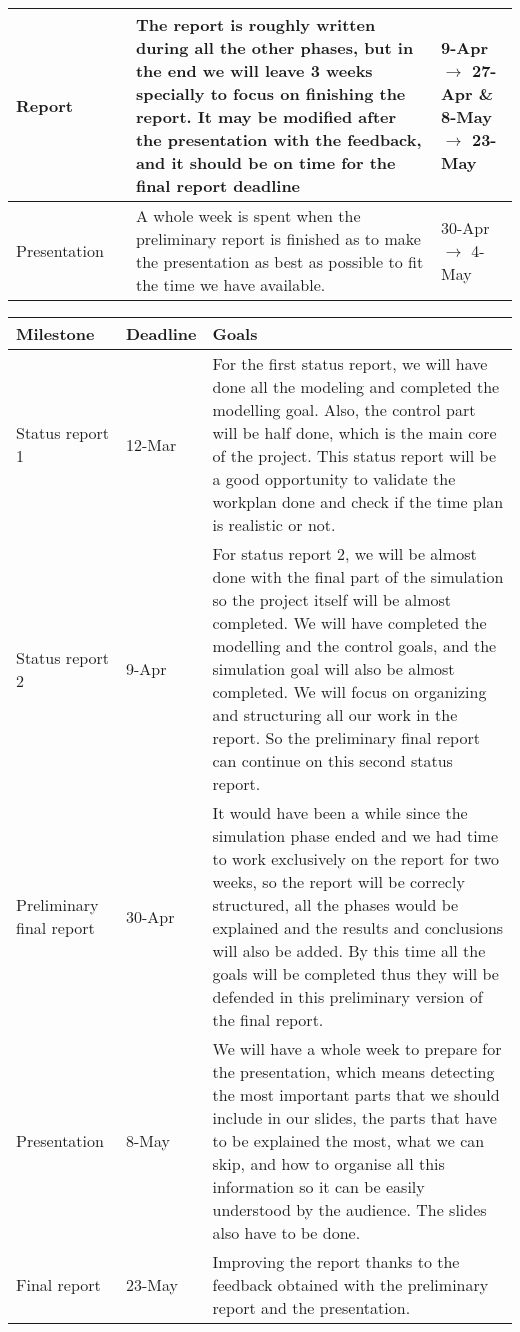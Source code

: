 \documentclass{article}
\begin{document}
\begin{center}
\begin{tabular}[H]{|C{2cm}|C{2cm}|C{7cm}|C{3cm}|}
		Report & & The report is roughly written during all the other phases, but in the end we will leave 3  weeks specially to focus on finishing the report. It may be modified after the presentation with the feedback, and it should be on time for the final report deadline & 9-Apr $\rightarrow$ 27-Apr \& 8-May $\rightarrow$ 23-May \\ \hline
		
		Presentation & & A whole week is spent when the preliminary report is finished as to make the presentation as best as possible to fit the time we have available. & 30-Apr $\rightarrow$ 4-May \\ \hline
	\end{tabular}
	\end{center}

	\begin{center}	
	\bigskip
	\begin{tabular}{|C{3cm}|C{3cm}|C{8.5cm}|} \hline
		Milestone & Deadline & Goals \\ \hline
		Status report 1 & 12-Mar & For the first status report, we will have done all the modeling and completed the modelling goal. Also, the control part will be half done, which is the main core of the project. This status report will be a good opportunity to validate the workplan done and check if the time plan is realistic or not.\\ \hline
		Status report 2 & 9-Apr & For status report 2, we will be almost done with the final part of the simulation so the project itself will be almost completed. We will have completed the modelling and the control goals, and the simulation goal will also be almost completed. We will focus on organizing and structuring all our work in the report. So the preliminary final report can continue on this second status report. \\ \hline
		Preliminary final report & 30-Apr & It would have been a while since the simulation phase ended and we had time to work exclusively on the report for two weeks, so the report will be correcly structured, all the phases would be explained and the results and conclusions will also be added. By this time all the goals will be completed thus they will be defended in this preliminary version of the final report.\\ \hline
		Presentation & 8-May & We will have a whole week to prepare for the presentation, which means detecting the most important parts that we should include in our slides, the parts that have to be explained the most, what we can skip, and how to organise all this information so it can be easily understood by the audience. The slides also have to be done.\\ \hline
		Final report & 23-May & Improving the report thanks to the feedback obtained with the preliminary report and the presentation.\\ \hline
	\end{tabular}
\end{center}	
\end{document}
